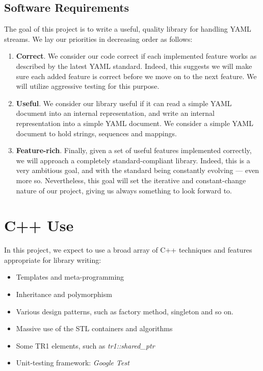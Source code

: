 \documentclass{article}
\begin{document}
\subsection{Software Requirements}
The goal of this project is to write a useful, quality library for handling YAML streams.  We lay our priorities in decreasing order as follows:

\begin{enumerate}
  \item \textbf{Correct}.  We consider our code correct if each implemented feature works as described by the latest YAML standard.  Indeed, this suggests we will make sure each added feature is correct before we move on to the next feature.  We will utilize aggressive testing for this purpose.
  \item \textbf{Useful}.  We consider our library useful if it can read a simple YAML document into an internal representation, and write an internal representation into a simple YAML document.  We consider a simple YAML document to hold strings, sequences and mappings.
  \item \textbf{Feature-rich}.  Finally, given a set of useful features implemented correctly, we will approach a completely standard-compliant library.  Indeed, this is a very ambitious goal, and with the standard being constantly evolving --- even more so.  Nevertheless, this goal will set the iterative and constant-change nature of our project, giving us always something to look forward to.
\end{enumerate}

\section{C++ Use}

In this project, we expect to use a broad array of C++ techniques and features appropriate for library writing:

\begin{itemize}
  \item Templates and meta-programming
  \item Inheritance and polymorphism
  \item Various design patterns, such as factory method, singleton and so on.
  \item Massive use of the STL containers and algorithms
  \item Some TR1 elements, such as \emph{tr1::shared\_ptr}
  \item Unit-testing framework:  \emph{Google Test}
\end{itemize}
\end{document}

